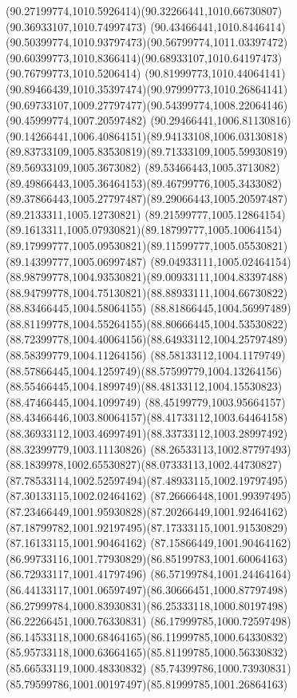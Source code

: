 {{  \curveto(90.27199774,1010.5926414)(90.32266441,1010.66730807)(90.36933107,1010.74997473)
  \curveto(90.43466441,1010.8446414)(90.50399774,1010.93797473)(90.56799774,1011.03397472)
  \curveto(90.60399773,1010.8366414)(90.68933107,1010.64197473)(90.76799773,1010.5206414)
  \curveto(90.81999773,1010.44064141)(90.89466439,1010.35397474)(90.97999773,1010.26864141)
  \curveto(90.69733107,1009.27797477)(90.54399774,1008.22064146)(90.45999774,1007.20597482)
  \curveto(90.29466441,1006.81130816)(90.14266441,1006.40864151)(89.94133108,1006.03130818)
  \curveto(89.83733109,1005.83530819)(89.71333109,1005.59930819)(89.56933109,1005.3673082)
  \curveto(89.53466443,1005.3713082)(89.49866443,1005.36464153)(89.46799776,1005.3433082)
  \curveto(89.37866443,1005.27797487)(89.29066443,1005.20597487)(89.2133311,1005.12730821)
  \curveto(89.21599777,1005.12864154)(89.1613311,1005.07930821)(89.18799777,1005.10064154)
  \curveto(89.17999777,1005.09530821)(89.11599777,1005.05530821)(89.14399777,1005.06997487)
  \curveto(89.04933111,1005.02464154)(88.98799778,1004.93530821)(89.00933111,1004.83397488)
  \curveto(88.94799778,1004.75130821)(88.88933111,1004.66730822)(88.83466445,1004.58064155)
  \curveto(88.81866445,1004.56997489)(88.81199778,1004.55264155)(88.80666445,1004.53530822)
  \curveto(88.72399778,1004.40064156)(88.64933112,1004.25797489)(88.58399779,1004.11264156)
  \curveto(88.58133112,1004.1179749)(88.57866445,1004.1259749)(88.57599779,1004.13264156)
  \curveto(88.55466445,1004.1899749)(88.48133112,1004.15530823)(88.47466445,1004.1099749)
  \curveto(88.45199779,1003.95664157)(88.43466446,1003.80064157)(88.41733112,1003.64464158)
  \curveto(88.36933112,1003.46997491)(88.33733112,1003.28997492)(88.32399779,1003.11130826)
  \curveto(88.26533113,1002.87797493)(88.1839978,1002.65530827)(88.07333113,1002.44730827)
  \curveto(87.78533114,1002.52597494)(87.48933115,1002.19797495)(87.30133115,1002.02464162)
  \curveto(87.26666448,1001.99397495)(87.23466449,1001.95930828)(87.20266449,1001.92464162)
  \curveto(87.18799782,1001.92197495)(87.17333115,1001.91530829)(87.16133115,1001.90464162)
  \lineto(87.15866449,1001.90464162)
  \curveto(86.99733116,1001.77930829)(86.85199783,1001.60064163)(86.72933117,1001.41797496)
  \curveto(86.57199784,1001.24464164)(86.44133117,1001.06597497)(86.30666451,1000.87797498)
  \curveto(86.27999784,1000.83930831)(86.25333118,1000.80197498)(86.22266451,1000.76330831)
  \curveto(86.17999785,1000.72597498)(86.14533118,1000.68464165)(86.11999785,1000.64330832)
  \curveto(85.95733118,1000.63664165)(85.81199785,1000.56330832)(85.66533119,1000.48330832)
  \curveto(85.74399786,1000.73930831)(85.79599786,1001.00197497)(85.81999785,1001.26864163)
}}
